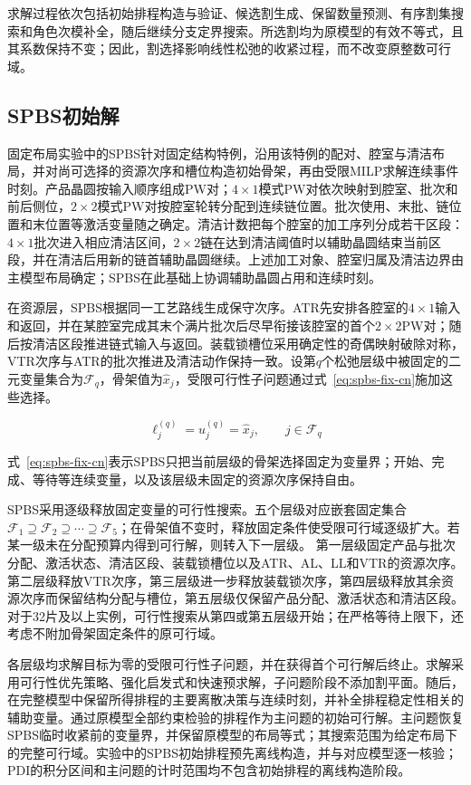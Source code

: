 \documentclass[final,5p,times,twocolumn]{elsarticle}
\begin{document}
求解过程依次包括初始排程构造与验证、候选割生成、保留数量预测、有序割集搜索和角色次模补全，随后继续分支定界搜索。所选割均为原模型的有效不等式，且其系数保持不变；因此，割选择影响线性松弛的收紧过程，而不改变原整数可行域。

\subsection{SPBS初始解}

固定布局实验中的SPBS针对固定结构特例，沿用该特例的配对、腔室与清洁布局，并对尚可选择的资源次序和槽位构造初始骨架，再由受限MILP求解连续事件时刻。产品晶圆按输入顺序组成PW对；$4\times1$模式PW对依次映射到腔室、批次和前后侧位，$2\times2$模式PW对按腔室轮转分配到连续链位置。批次使用、末批、链位置和末位置等激活变量随之确定。清洁计数把每个腔室的加工序列分成若干区段：$4\times1$批次进入相应清洁区间，$2\times2$链在达到清洁阈值时以辅助晶圆结束当前区段，并在清洁后用新的链首辅助晶圆继续。上述加工对象、腔室归属及清洁边界由主模型布局确定；SPBS在此基础上协调辅助晶圆占用和连续时刻。

在资源层，SPBS根据同一工艺路线生成保守次序。ATR先安排各腔室的$4\times1$输入和返回，并在某腔室完成其末个满片批次后尽早衔接该腔室的首个$2\times2$PW对；随后按清洁区段推进链式输入与返回。装载锁槽位采用确定性的奇偶映射破除对称，VTR次序与ATR的批次推进及清洁动作保持一致。设第$q$个松弛层级中被固定的二元变量集合为$\mathcal F_q$，骨架值为$\widehat x_j$，受限可行性子问题通过式~\eqref{eq:spbs-fix-cn}施加这些选择。

\begin{equation}
\ell_j^{(q)}=u_j^{(q)}=\widehat x_j,\qquad j\in\mathcal F_q
\label{eq:spbs-fix-cn}
\end{equation}

式~\eqref{eq:spbs-fix-cn}表示SPBS只把当前层级的骨架选择固定为变量界；开始、完成、等待等连续变量，以及该层级未固定的资源次序保持自由。

SPBS采用逐级释放固定变量的可行性搜索。五个层级对应嵌套固定集合$\mathcal F_1\supseteq\mathcal F_2\supseteq\cdots\supseteq\mathcal F_5$；在骨架值不变时，释放固定条件使受限可行域逐级扩大。若某一级未在分配预算内得到可行解，则转入下一层级。
第一层级固定产品与批次分配、激活状态、清洁区段、装载锁槽位以及ATR、AL、LL和VTR的资源次序。第二层级释放VTR次序，第三层级进一步释放装载锁次序，第四层级释放其余资源次序而保留结构分配与槽位，第五层级仅保留产品分配、激活状态和清洁区段。对于32片及以上实例，可行性搜索从第四或第五层级开始；在严格等待上限下，还考虑不附加骨架固定条件的原可行域。

各层级均求解目标为零的受限可行性子问题，并在获得首个可行解后终止。求解采用可行性优先策略、强化启发式和快速预求解，子问题阶段不添加割平面。随后，在完整模型中保留所得排程的主要离散决策与连续时刻，并补全排程稳定性相关的辅助变量。通过原模型全部约束检验的排程作为主问题的初始可行解。主问题恢复SPBS临时收紧前的变量界，并保留原模型的布局等式；其搜索范围为给定布局下的完整可行域。实验中的SPBS初始排程预先离线构造，并与对应模型逐一核验；PDI的积分区间和主问题的计时范围均不包含初始排程的离线构造阶段。
\end{document}
